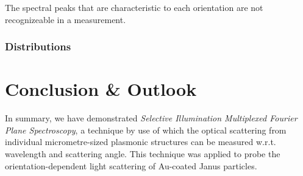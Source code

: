 \documentclass[10pt]{article}
\newcommand{\reffig}[2]{\mbox{\sffamily{Figure \ref{#1}#2}}}
\begin{document}
The spectral peaks that are characteristic to each orientation are not recognizeable in a measurement. 







\subsubsection*{Distributions} 











\section*{Conclusion \& Outlook}


In summary, we have demonstrated \emph{Selective Illumination Multiplexed Fourier Plane Spectroscopy}, a technique by use of which the optical scattering from individual micrometre-sized plasmonic structures can be measured w.r.t. wavelength and scattering angle. 
This technique was applied to probe the orientation-dependent light scattering of Au-coated Janus particles.  
\end{document}

